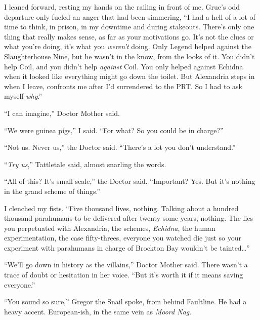 I leaned forward, resting my hands on the railing in front of me.  Grue's odd departure only fueled an anger that had been simmering, ``I had a hell of a lot of time to think, in prison, in my downtime and during stakeouts.  There's only one thing that really makes sense, as far as your motivations go.  It's not the clues or what you're doing, it's what you \emph{weren't} doing.  Only Legend helped against the Slaughterhouse Nine, but he wasn't in the know, from the looks of it.  You didn't help Coil, and you didn't help \emph{against} Coil.  You only helped against Echidna when it looked like everything might go down the toilet.  But Alexandria steps in when I leave, confronts me after I'd surrendered to the PRT.  So I had to ask myself \emph{why}.''



``I can imagine,'' Doctor Mother said.



``We were guinea pigs,'' I said.  ``For what?  So you could be in charge?''



``Not us.  Never us,'' the Doctor said.  ``There's a lot you don't understand.''



``\emph{Try us},'' Tattletale said, almost snarling the words.



``All of this?  It's small scale,'' the Doctor said.  ``Important?  Yes.  But it's nothing in the grand scheme of things.''



I clenched my fists.  ``Five thousand lives, nothing.  Talking about a hundred thousand parahumans to be delivered after twenty-some years, nothing.  The lies you perpetuated with Alexandria, the schemes, \emph{Echidna}, the human experimentation, the case fifty-threes, everyone you watched die just so your experiment with parahumans in charge of Brockton Bay wouldn't be tainted\ldots''



``We'll go down in history as the villains,'' Doctor Mother said.  There wasn't a trace of doubt or hesitation in her voice.  ``But it's worth it if it means saving everyone.''



``You sound so sure,'' Gregor the Snail spoke, from behind Faultline.  He had a heavy accent.  European-ish, in the same vein as \emph{Moord Nag}.



